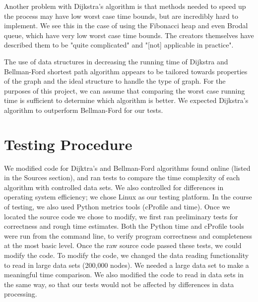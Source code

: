 \documentclass{article}
\begin{document}
Another problem with Dijkstra's algorithm is that methods needed to speed up the process may have low worst case time bounds, but are incredibly hard to implement. We see this in the case of using the Fibonacci heap and even Brodal queue, which have very low worst case time bounds.  The creators themselves have described them to be "quite complicated" and "[not] applicable in practice".


The use of data structures in decreasing the running time of Dijkstra and Bellman-Ford shortest path algorithm appears to be tailored towards properties of the graph and the ideal structure to handle the type of graph. For the purposes of this project, we can assume that comparing the worst case running time is sufficient to determine which algorithm is better. We expected Dijkstra's algorithm to outperform Bellman-Ford for our tests.


\section{Testing Procedure}
We modified code for Dijktra's and Bellman-Ford algorithms found online (listed in the Sources section), and ran tests to compare the time complexity of each algorithm with controlled data sets.  We also controlled for differences in operating system efficiency; we chose Linux as our testing platform.  In the course of testing, we also used Python metrics tools (cProfile and time).  Once we located the source code we chose to modify, we first ran preliminary tests for correctness and rough time estimates.  Both the Python time and cProfile tools were run from the command line, to verify program correctness and completeness at the most basic level.  Once the raw source code passed these tests, we could modify the code.
To modify the code, we changed the data reading functionality to read in large data sets (200,000 nodes).  We needed a large data set to make a meaningful time comparison.
 We also modified the code to read in data sets in the same way, so that our tests would not be affected by differences in data processing.
 
\pagebreak
\end{document}
